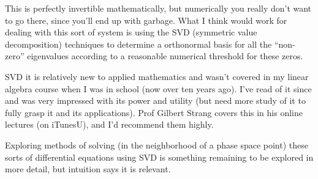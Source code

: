 This is perfectly invertible mathematically, but numerically you really don't want to go there, since you'll end up with garbage.  What I think would work for dealing with this sort of system is using the SVD (symmetric value decomposition) techniques to determine a orthonormal basis for all the ``non-zero'' eigenvalues according to a reasonable numerical threshold for these zeros.  

SVD it is relatively new to applied mathematics and wasn't covered in my linear algebra course when I was in school (now over ten years ago).  I've read of it since and was very impressed with its power and utility (but need more study of it to fully grasp it and its applications).  Prof Gilbert Strang covers this in his online lectures (on iTunesU), and I'd recommend them highly.

Exploring methods of solving (in the neighborhood of a phase space point) these sorts of differential equations using SVD is something remaining to be explored in more detail, but intuition says it is relevant.

\EndNoBibArticle
